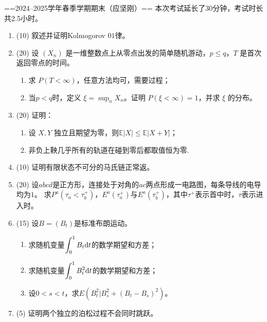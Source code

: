 ==2024--2025学年春季学期期末（应坚刚）==
本次考试延长了30分钟，考试时长共2.5小时。
\begin{enumerate}
    \item (10)
    叙述并证明Kolmogorov $01$律。
    \item (20)
    设 \( (X_n) \) 是一维整数点上从零点出发的简单随机游动，\( p \leqslant q \)，\( T \) 是首次返回零点的时间。
    \begin{enumerate}[label=(\arabic*)]
        \item 求 \( P(T < \infty) \)，任意方法均可，需要过程；
        \item 当\( p < q \)时，定义 \( \xi = \sup_n X_n \)。证明 \( P(\xi < \infty) = 1 \)，并求 \( \xi \) 的分布。
    \end{enumerate}
    \item (20)
    证明：
    \begin{enumerate}[label=(\arabic*)]
        \item 设 \( X, Y \) 独立且期望为零，则\( \mathbb{E}|X| \leqslant \mathbb{E}|X+Y| \)；
        \item 非负上鞅几乎所有的轨道在碰到零后都取值恒为零.
    \end{enumerate}
    \item (10)
    证明有限状态不可分的马氏链正常返。
    \item (20)
    设\( abcd \)是正方形，连接处于对角的\( ac \)两点形成一电路图，每条导线的电导均为$1$。
    求\( P^a(\tau_a<\tau_b^+) \)，\( E^a(\tau_a^+) \)与\( E^a(\tau_b^+) \)，其中\( \tau^+ \)表示首中时，\( \tau \)表示进入时。
    \item (15)
    设\( B=(B_t) \)是标准布朗运动。
    \begin{enumerate}[label=(\arabic*)]
        \item 求随机变量\( \displaystyle\int_0^1 B_t{\rm d}t \)的数学期望和方差；
        \item 求随机变量\( \displaystyle\int_0^1 B_t^2{\rm d}t \)的数学期望和方差；
        \item 设\( 0<s<t \)，求\( E(B_t^2|B_s^2+(B_t-B_s)^2) \)。
    \end{enumerate}
    \item (5)
    证明两个独立的泊松过程不会同时跳跃。
\end{enumerate}

